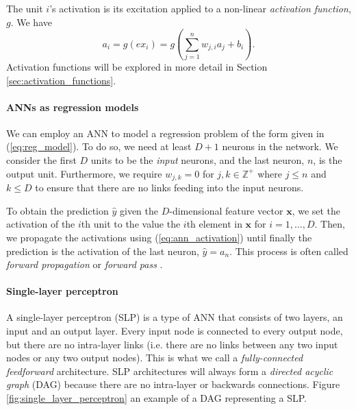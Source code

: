 \documentclass{report}
\renewcommand\vec{\mathbf}
\begin{document}
The unit $i$'s activation is its excitation applied to a non-linear \textit{activation function}, $g$. We have
\begin{equation}
    \label{eq:ann_activation}
    a_i = g\left({ex}_i\right) = g\left(\sum_{j=1}^n{w_{j,i} a_j} + b_i\right).
\end{equation}
Activation functions will be explored in more detail in Section \ref{sec:activation_functions}. 


\paragraph{ANNs as regression models}
We can employ an ANN to model a regression problem of the form given in (\ref{eq:reg_model}). 
To do so, we need at least $D+1$ neurons in the network. 
We consider the first $D$ units to be the \textit{input} neurons, and the last neuron, $n$, is the output unit.
Furthermore, we require $w_{j,k}=0$ for $j,k \in \mathbb{Z}^+$ where $j \leq n$ and $k \leq D$ to ensure that there are no links feeding into the input neurons.

To obtain the prediction $\hat{y}$ given the $D$-dimensional feature vector $\vec{x}$, we set the activation of the $i$th unit to the value the $i$th element in $\vec{x}$ for $i=1,\dots,D$.
Then, we propagate the activations using (\ref{eq:ann_activation}) until finally the prediction is the activation of the last neuron, $\hat{y}=a_n$.
This process is often called \textit{forward propagation} or \textit{forward pass} \cite{russell2010}.

\paragraph{Single-layer perceptron}
A single-layer perceptron (SLP) is a type of ANN that consists of two layers, an input and an output layer.
Every input node is connected to every output node, but there are no intra-layer links (i.e. there are no links between any two input nodes or any two output nodes). 
This is what we call a \textit{fully-connected feedforward} architecture.
SLP architectures will always form a \textit{directed acyclic graph} (DAG) because there are no intra-layer or backwards connections.
Figure \ref{fig:single_layer_perceptron} an example of a DAG representing a SLP.
\end{document}
